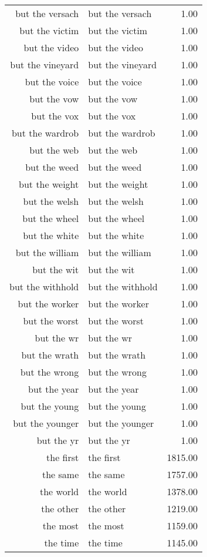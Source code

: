 \begin{table}[ht]
\begin{tabular}{rlr}
  but the versach & but the versach & 1.00 \\ 
  but the victim & but the victim & 1.00 \\ 
  but the video & but the video & 1.00 \\ 
  but the vineyard & but the vineyard & 1.00 \\ 
  but the voice & but the voice & 1.00 \\ 
  but the vow & but the vow & 1.00 \\ 
  but the vox & but the vox & 1.00 \\ 
  but the wardrob & but the wardrob & 1.00 \\ 
  but the web & but the web & 1.00 \\ 
  but the weed & but the weed & 1.00 \\ 
  but the weight & but the weight & 1.00 \\ 
  but the welsh & but the welsh & 1.00 \\ 
  but the wheel & but the wheel & 1.00 \\ 
  but the white & but the white & 1.00 \\ 
  but the william & but the william & 1.00 \\ 
  but the wit & but the wit & 1.00 \\ 
  but the withhold & but the withhold & 1.00 \\ 
  but the worker & but the worker & 1.00 \\ 
  but the worst & but the worst & 1.00 \\ 
  but the wr & but the wr & 1.00 \\ 
  but the wrath & but the wrath & 1.00 \\ 
  but the wrong & but the wrong & 1.00 \\ 
  but the year & but the year & 1.00 \\ 
  but the young & but the young & 1.00 \\ 
  but the younger & but the younger & 1.00 \\ 
  but the yr & but the yr & 1.00 \\ 
  the first & the first & 1815.00 \\ 
  the same & the same & 1757.00 \\ 
  the world & the world & 1378.00 \\ 
  the other & the other & 1219.00 \\ 
  the most & the most & 1159.00 \\ 
  the time & the time & 1145.00 \\ 

\end{tabular}
\end{table}
